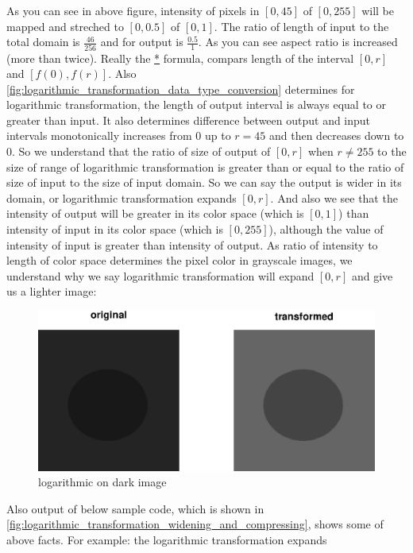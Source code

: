 \begin{enumerate}
    As you can see in above figure, intensity of pixels in $[0,45]$ of $[0,
    255]$ will be mapped and streched to $[0,0.5]$ of $[0,1]$. The ratio of
    length of input to the total domain is $\frac{46}{256}$ and for output is 
    $\frac{0.5}{1}$. As you can see aspect ratio is increased (more than twice).
    Really the \hyperref[relation:eq_1]{*} formula, compars length of the
    interval $[0,r]$ and $[f(0), f(r)]$. Also 
    \autoref{fig:logarithmic_transformation_data_type_conversion} determines for
    logarithmic transformation, the length of output interval is always equal to
    or greater than input. It also determines difference between output and
    input intervals monotonically increases from $0$ up to $r=45$ and then
    decreases down to $0$.  
So we understand that the ratio of size of output of $[0,r]$ when $r \not= 255$
to the size of range of logarithmic transformation is greater than or equal to
the ratio of size of input to the size of input domain. So we can say the output
is wider in its domain, or logarithmic transformation expands $[0,r]$. 
And also we see that the intensity of output will be greater in its
color space (which is $[0,1]$) than intensity of input in its color space (which
is $[0,255]$), although the value of intensity of input is greater than
intensity of output. As ratio of intensity to length of color space determines
the pixel color in grayscale images, we understand why we say logarithmic
transformation will expand $[0,r]$ and give us a lighter image:
\begin{figure}[H]
    \includegraphics[scale=0.4]{logarithmic_on_dark_image.eps}
    \centering
    \caption{logarithmic on dark image}
    \label{fig:logarithmic_on_dark_image}
\end{figure}
Also output of below sample code, which is shown in 
\autoref{fig:logarithmic_transformation_widening_and_compressing}, shows 
some of above facts. For example: the logarithmic transformation expands 

\end{enumerate}
